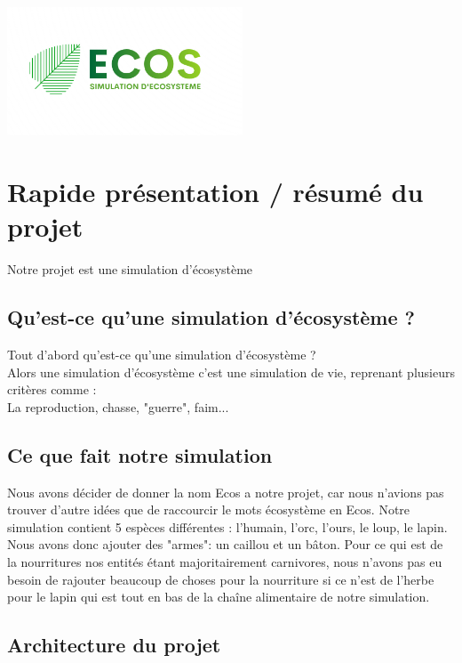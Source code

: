 \documentclass[a4paper, 11pt]{article}
\title{}
\author{CHAMPENOIS Brandon \textsc{G5B} \\ BONVARLET Bastien \textsc{G5B} \\ MASSON Joris \textsc{G5B} }
\begin{document}
\maketitle
\centerline{\includegraphics[width = 7cm]{images/ecos.png}}
\tableofcontents
\newpage

\section{Rapide présentation / résumé du projet}
Notre projet est une simulation d'écosystème\\

\subsection*{Qu'est-ce qu'une simulation d'écosystème ?}
Tout d'abord qu'est-ce qu'une simulation d'écosystème ?\\
Alors une simulation d'écosystème c'est une simulation de vie, reprenant plusieurs critères comme :\\
La reproduction, chasse, "guerre", faim...\\

\subsection{Ce que fait notre simulation}
Nous avons décider de donner la nom Ecos a notre projet, car nous n'avions pas trouver d'autre idées que de raccourcir le mots écosystème en Ecos. Notre simulation contient 5 espèces différentes : l'humain, l'orc, l'ours, le loup, le lapin. Nous avons donc ajouter des "armes": un caillou et un bâton. Pour ce qui est de la nourritures nos entités étant majoritairement carnivores, nous n'avons pas eu besoin de rajouter beaucoup de choses pour la nourriture si ce n'est de l'herbe pour le lapin qui est tout en bas de la chaîne alimentaire de notre simulation.\\
\subsection{Architecture du projet}
\end{document}
